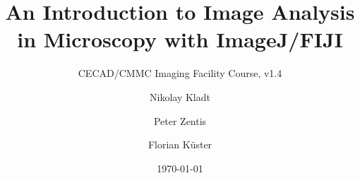 \documentclass[12pt,twoside, parskip=half, headsepline=on, chapterprefix=true, draft=off]{scrbook}
\newcounter{taskcounter}
\begin{document}
\title{An Introduction to Image Analysis in Microscopy with ImageJ/FIJI}
\subtitle{CECAD/CMMC Imaging Facility Course, v1.4} 
\author{Nikolay Kladt \and Peter Zentis \and Florian Küster}
\date{\today}
\publishers{Imaging Facilities\\Cluster of Excellence -- Cellular Stress Responses in Aging-Associated Diseases\\and\\Center for Molecular Medicine Cologne\\University of Cologne}

\maketitle



\tableofcontents



\setcounter{taskcounter}{0}


\setcounter{taskcounter}{0}





\end{document}
